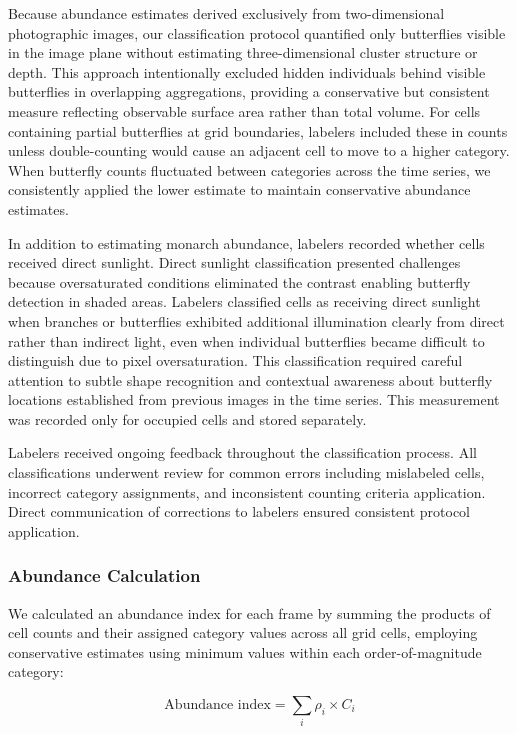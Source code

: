 Because abundance estimates derived exclusively from two-dimensional photographic images, our classification protocol quantified only butterflies visible in the image plane without estimating three-dimensional cluster structure or depth. This approach intentionally excluded hidden individuals behind visible butterflies in overlapping aggregations, providing a conservative but consistent measure reflecting observable surface area rather than total volume. For cells containing partial butterflies at grid boundaries, labelers included these in counts unless double-counting would cause an adjacent cell to move to a higher category. When butterfly counts fluctuated between categories across the time series, we consistently applied the lower estimate to maintain conservative abundance estimates.

In addition to estimating monarch abundance, labelers recorded whether cells received direct sunlight. Direct sunlight classification presented challenges because oversaturated conditions eliminated the contrast enabling butterfly detection in shaded areas. Labelers classified cells as receiving direct sunlight when branches or butterflies exhibited additional illumination clearly from direct rather than indirect light, even when individual butterflies became difficult to distinguish due to pixel oversaturation. This classification required careful attention to subtle shape recognition and contextual awareness about butterfly locations established from previous images in the time series. This measurement was recorded only for occupied cells and stored separately.

Labelers received ongoing feedback throughout the classification process. All classifications underwent review for common errors including mislabeled cells, incorrect category assignments, and inconsistent counting criteria application. Direct communication of corrections to labelers ensured consistent protocol application.

\subsubsection{Abundance Calculation}

We calculated an abundance index for each frame by summing the products of cell counts and their assigned category values across all grid cells, employing conservative estimates using minimum values within each order-of-magnitude category:

\begin{equation}
\text{Abundance index} = \sum_{i} \rho_i \times C_i
\end{equation}

